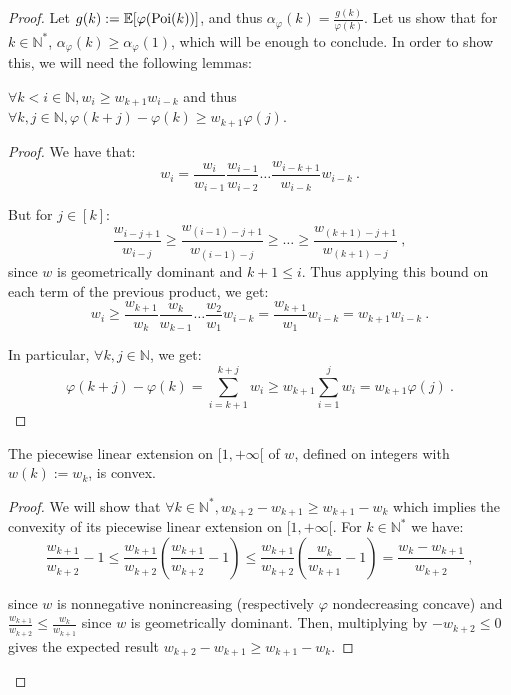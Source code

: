   \begin{proof}
  Let $g(k) := \mathbb{E}[\varphi(\operatorname{\text{Poi}}(k))]$, and thus $\alpha_{\varphi}(k) = \frac{g(k)}{\varphi(k)}$. Let us show that for $k \in \mathbb{N}^*$, $\alpha_{\varphi}(k) \geq \alpha_{\varphi}(1)$, which will be enough to conclude. In order to show this, we will need the following lemmas:
  
  \begin{lemma}
    $\forall k < i \in \mathbb{N}, w_i \geq w_{k+1}w_{i-k}$ and thus $\forall k,j \in \mathbb{N}, \varphi(k+j) - \varphi(k) \geq w_{k+1} \varphi(j)$.
    \label{lem:geoDominant}
  \end{lemma}

  \begin{proof}
    We have that:
    \[w_i = \frac{w_i}{w_{i-1}}\frac{w_{i-1}}{w_{i-2}}\ldots\frac{w_{i-k+1}}{w_{i-k}}w_{i-k} \ .\]

    But for $j \in [k]$:
    \[ \frac{w_{i-j+1}}{w_{i-j}} \geq \frac{w_{(i-1)-j+1}}{w_{(i-1)-j}} \geq \ldots \geq \frac{w_{(k+1)-j+1}}{w_{(k+1)-j}} \ , \]
    since $w$ is geometrically dominant and $k+1 \leq i$. Thus applying this bound on each term of the previous product, we get:
    \[w_i \geq \frac{w_{k+1}}{w_{k}}\frac{w_{k}}{w_{k-1}}\ldots\frac{w_{2}}{w_{1}}w_{i-k} = \frac{w_{k+1}}{w_1} w_{i-k} = w_{k+1} w_{i-k} \ . \]

    In particular, $\forall k,j \in \mathbb{N}$, we get:
    \[\varphi(k+j) - \varphi(k) = \sum_{i=k+1}^{k+j} w_i \geq w_{k+1}\sum_{i=1}^{j} w_i = w_{k+1} \varphi(j) \ .\]
  \end{proof}
  
  \begin{lemma}
    The piecewise linear extension on $[1,+\infty[$ of $w$, defined on integers with $w(k):=w_k$, is convex.
    \label{lem:wConvex}
  \end{lemma}

  \begin{proof}
    We will show that $\forall k \in \mathbb{N}^*, w_{k+2}-w_{k+1} \geq w_{k+1}-w_k$ which implies the convexity of its piecewise linear extension on $[1,+\infty[$. For $k \in \mathbb{N}^*$ we have:
        \[ \frac{w_{k+1}}{w_{k+2}}-1 \leq \frac{w_{k+1}}{w_{k+2}}\left(\frac{w_{k+1}}{w_{k+2}} - 1\right) \leq \frac{w_{k+1}}{w_{k+2}}\left(\frac{w_{k}}{w_{k+1}}-1\right) = \frac{w_k-w_{k+1}}{w_{k+2}} \ , \]

        since $w$ is nonnegative nonincreasing (respectively $\varphi$ nondecreasing concave) and $\frac{w_{k+1}}{w_{k+2}} \leq \frac{w_{k}}{w_{k+1}}$ since $w$ is geometrically dominant. Then, multiplying by $-w_{k+2} \leq 0$ gives the expected result $w_{k+2}-w_{k+1} \geq w_{k+1}-w_k$.
  \end{proof}
  

\end{proof}
